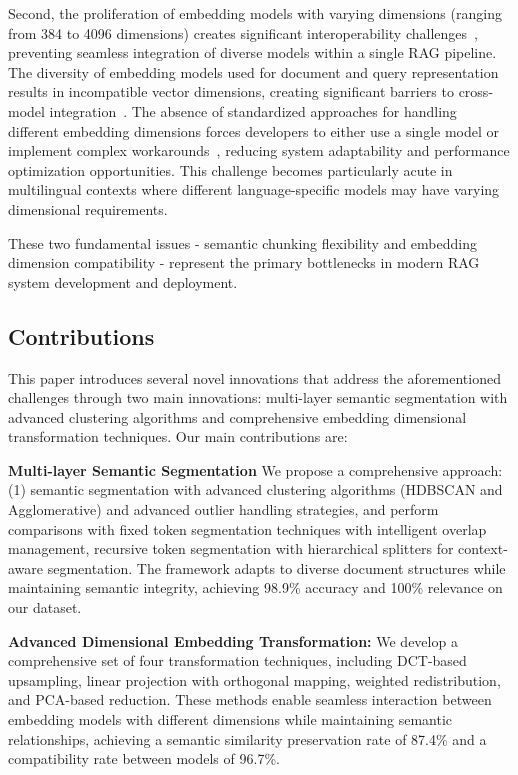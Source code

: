 \documentclass[10pt,twocolumn,letterpaper]{article}
\begin{document}
\vspace{0.5em}
Second, the proliferation of embedding models with varying dimensions (ranging from 384 to 4096 dimensions) creates significant interoperability challenges~\cite{brown2024cross,conneau2018word}, preventing seamless integration of diverse models within a single RAG pipeline. The diversity of embedding models used for document and query representation results in incompatible vector dimensions, creating significant barriers to cross-model integration~\cite{brown2024cross,garcia2024dimensionality}. The absence of standardized approaches for handling different embedding dimensions forces developers to either use a single model or implement complex workarounds~\cite{anderson2023embedding}, reducing system adaptability and performance optimization opportunities. This challenge becomes particularly acute in multilingual contexts where different language-specific models may have varying dimensional requirements.

These two fundamental issues - semantic chunking flexibility and embedding dimension compatibility - represent the primary bottlenecks in modern RAG system development and deployment.

\subsection{Contributions}

This paper introduces several novel innovations that address the aforementioned challenges through two main innovations: multi-layer semantic segmentation with advanced clustering algorithms and comprehensive embedding dimensional transformation techniques. Our main contributions are:

\vspace{0.5em}
\textbf{Multi-layer Semantic Segmentation} We propose a comprehensive approach: (1) semantic segmentation with advanced clustering algorithms (HDBSCAN and Agglomerative) and advanced outlier handling strategies, and perform comparisons with fixed token segmentation techniques with intelligent overlap management, recursive token segmentation with hierarchical splitters for context-aware segmentation. The framework adapts to diverse document structures while maintaining semantic integrity, achieving 98.9\% accuracy and 100\% relevance on our dataset.

\vspace{0.5em}
\textbf{Advanced Dimensional Embedding Transformation:} We develop a comprehensive set of four transformation techniques, including DCT-based upsampling, linear projection with orthogonal mapping, weighted redistribution, and PCA-based reduction. These methods enable seamless interaction between embedding models with different dimensions while maintaining semantic relationships, achieving a semantic similarity preservation rate of 87.4\% and a compatibility rate between models of 96.7\%.
\end{document}

